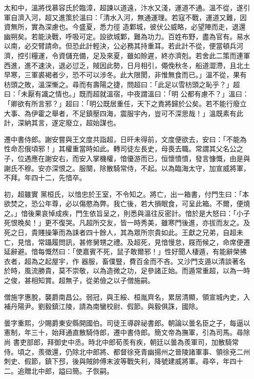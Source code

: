 \begin{pinyinscope}
 太和中，溫將伐慕容氏於臨漳，超諫以道遠，汴水又淺，運道不通。溫不從，遂引軍自濟入河，超又進策於溫曰：「清水入河，無通運理。若寇不戰，運道又難，因資無所，實為深慮也。今盛夏，悉力徑
 造鄴城，彼伏公威略，必望陣而走，退還幽朔矣。若能決戰，呼吸可定。設欲城鄴，難為功力。百姓布野，盡為官有。易水以南，必交臂請命。但恐此計輕決，公必務其持重耳。若此計不從，便當頓兵河濟，控引糧運，令資儲充備，足及來夏，雖如賒遲，終亦濟剋。若舍此二策而連軍西進，進不速決，退必愆乏，賊因此勢，日月相引，僶俛秋冬，船道澀滯，且北土早寒，三軍裘褐者少，恐不可以涉冬。此大限閡，非惟無食而已。」溫不從，果有枋頭之敗，溫深慚之。尋而有壽陽之捷，問超曰：「此足以雪枋頭之恥乎？」超曰：「未厭有識之情也。」既而超就溫宿，中夜謂溫曰：「明
 公都有慮不？」溫曰：「卿欲有所言邪？」超曰：「明公既居重任，天下之責將歸於公矣。若不能行廢立大事、為伊霍之舉者，不足鎮壓四海，震服宇內，豈可不深思哉！」溫既素有此計，深納其言，遂定廢立，超始謀也。



 遷中書侍郎。謝安嘗與王文度共詣超，日旰未得前，文度便欲去，安曰：「不能為性命忍俄頃邪！」其權重當時如此。轉司徒左長史，母喪去職。常謂其父名公之子，位遇應在謝安右，而安入掌機權，愔優游而已，恒懷憤憤，發言慷慨，由是與謝氏不穆。安亦深恨之。服闋，除散騎常侍，不起。以為臨海太守，加宣威將軍，不拜。年四十二，先愔卒。



 初，超雖實
 黨桓氏，以愔忠於王室，不令知之。將亡，出一箱書，付門生曰：「本欲焚之，恐公年尊，必以傷愍為弊。我亡後，若大損眠食，可呈此箱。不爾，便燒之。」愔後果哀悼成疾，門生依旨呈之，則悉與溫往反密計。愔於是大怒曰：「小子死恨晚矣！」更不復哭。凡超所交友，皆一時秀美，雖寒門後進，亦拔而友之。及死之日，貴賤操筆而為誄者四十餘人，其為眾所宗貴如此。王獻之兄弟，自超未亡，見愔，常躡履問訊，甚修舅甥之禮。及超死，見愔慢怠，屐而候之，命席便遷延辭避。愔每慨然曰：「使嘉賓不死，鼠子敢爾邪！」性好聞人棲遁，有能辭榮拂衣者，超為之起屋宇，作
 器服，畜僕豎，費百金而不吝。又沙門支遁以清談著名於時，風流勝貴，莫不崇敬，以為造微之功，足參諸正始。而遁常重超，以為一時之俊，甚相知賞。超無子，從弟儉之以子僧施嗣。



 僧施字惠脫，襲爵南昌公。弱冠，與王綏、桓胤齊名，累居清顯，領宣城內史，入補丹陽尹。劉毅鎮江陵，請為南蠻校尉、假節。與毅俱誅，國除。



 曇字重熙，少賜爵東安縣開國伯。司徒王導辟祕書郎。朝論以曇名臣之子，每逼以憲制，年三十，始拜通直散騎侍郎，遷中書侍郎。簡文帝為撫軍，引為司馬。尋除尚
 書吏部郎，拜御史中丞。時北中郎荀羨有疾，朝廷以曇為羨軍司，加散騎常侍。頃之，羨徵還，仍除北中郎將、都督徐兗青幽揚州之晉陵諸軍事、領徐兗二州刺史、假節，鎮下邳，後與賊帥傅末波等戰失利，降號建威將軍。尋卒，年四十二。追贈北中郎，謚曰簡。子恢嗣。




\end{pinyinscope}
